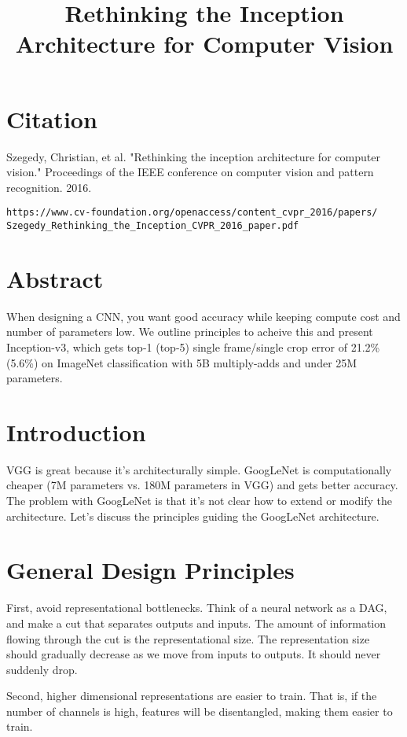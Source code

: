 \documentclass[a4paper]{article}
\title{Rethinking the Inception Architecture for Computer Vision}
\date{}
\begin{document}
\maketitle

\section{Citation}
Szegedy, Christian, et al. "Rethinking the inception architecture for computer vision." Proceedings of the IEEE conference on computer vision and pattern recognition. 2016.

\begin{verbatim}
https://www.cv-foundation.org/openaccess/content_cvpr_2016/papers/
Szegedy_Rethinking_the_Inception_CVPR_2016_paper.pdf
\end{verbatim}

\section{Abstract}
When designing a CNN, you want good accuracy while keeping compute cost and
number of parameters low. We outline principles to acheive this and present
Inception-v3, which gets top-1 (top-5) single frame/single crop error of
21.2\% (5.6\%) on ImageNet classification with 5B multiply-adds and under 25M
parameters.

\section{Introduction}
VGG is great because it's architecturally simple. GoogLeNet is computationally
cheaper (7M parameters vs. 180M parameters in VGG) and gets better accuracy.
The problem with GoogLeNet is that it's not clear how to extend or modify the
architecture. Let's discuss the principles guiding the GoogLeNet architecture.

\section{General Design Principles}
First, avoid representational bottlenecks. Think of a neural network as a DAG,
and make a cut that separates outputs and inputs. The amount of information
flowing through the cut is the representational size. The representation size
should gradually decrease as we move from inputs to outputs. It should never
suddenly drop.

Second, higher dimensional representations are easier to train. That is, if
the number of channels is high, features will be disentangled, making them
easier to train.
\end{document}
